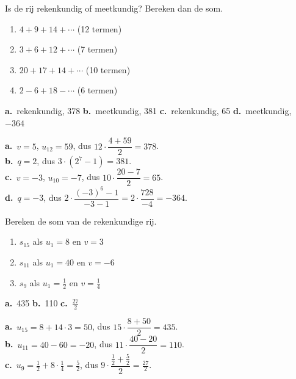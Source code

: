 \begin{oefeningen}
\begin{oefening}[1]\label{oef:h3-soort}
Is de rij rekenkundig of meetkundig? Bereken dan de som.
\begin{enumerate}
  \item $4 + 9 + 14 + \cdots$ (12 termen)
  \item $3 + 6 + 12 + \cdots$ (7 termen)
  \item $20 + 17 + 14 + \cdots$ (10 termen)
  \item $2 - 6 + 18 - \cdots$ (6 termen)
\end{enumerate}
\begin{solution}
\textbf{a.}~rekenkundig, 378 \quad \textbf{b.}~meetkundig, 381 \quad \textbf{c.}~rekenkundig, 65 \quad \textbf{d.}~meetkundig, $-364$
\end{solution}
\begin{fullsolution}
\textbf{a.}~$v=5$, $u_{12}=59$, dus $12\cdot\dfrac{4+59}{2}=378$.\\
\textbf{b.}~$q=2$, dus $3\cdot(2^7-1)=381$.\\
\textbf{c.}~$v=-3$, $u_{10}=-7$, dus $10\cdot\dfrac{20-7}{2}=65$.\\
\textbf{d.}~$q=-3$, dus $2\cdot\dfrac{(-3)^6-1}{-3-1}=2\cdot\dfrac{728}{-4}=-364$.
\end{fullsolution}
\end{oefening}

\begin{oefening}[1]\label{oef:h3-rrsom}
Bereken de som van de rekenkundige rij.
\begin{enumerate}
  \item $s_{15}$ als $u_1 = 8$ en $v = 3$
  \item $s_{11}$ als $u_1 = 40$ en $v = -6$
  \item $s_9$ als $u_1 = \tfrac12$ en $v = \tfrac14$
\end{enumerate}
\begin{solution}
\textbf{a.}~435 \quad \textbf{b.}~110 \quad \textbf{c.}~$\tfrac{27}{2}$
\end{solution}
\begin{fullsolution}
\textbf{a.}~$u_{15}=8+14\cdot 3=50$, dus $15\cdot\dfrac{8+50}{2}=435$.\\
\textbf{b.}~$u_{11}=40-60=-20$, dus $11\cdot\dfrac{40-20}{2}=110$.\\
\textbf{c.}~$u_9=\tfrac12+8\cdot\tfrac14=\tfrac52$, dus $9\cdot\dfrac{\tfrac12+\tfrac52}{2}=\tfrac{27}{2}$.
\end{fullsolution}
\end{oefening}


\end{oefeningen}
